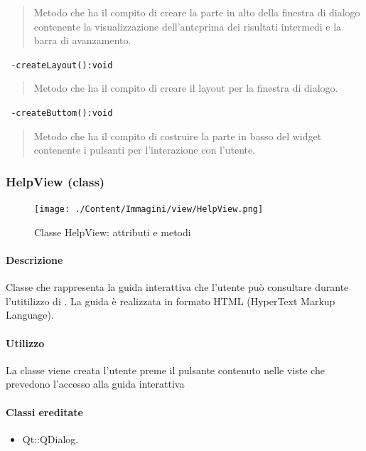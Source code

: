 \begin{quote}
\color{black} Metodo che ha il compito di creare la parte in alto della finestra di dialogo contenente la visualizzazione dell'anteprima dei risultati intermedi e la barra di avanzamento.
\end{quote} 
\color{blue}\verb! -createLayout():void!
\begin{quote}
\color{black} Metodo che ha il compito di creare il layout per la finestra di dialogo.
\end{quote} 
\color{blue}\verb! -createButtom():void!
\color{black}
\begin{quote}
 Metodo che ha il compito di costruire la parte in basso del widget contenente i pulsanti per l'interazione con l'utente.
\end{quote}
\color{black}
\pagebreak
\subsubsection{HelpView (class)}
\label{spehelps}
\begin{figure}[!h]
\centering
			\texttt{[image: ./Content/Immagini/view/HelpView.png]}
			\caption{Classe HelpView: attributi e metodi}
			\label{cl_help}
\end{figure}
\paragraph{Descrizione \\}
Classe che rappresenta la guida interattiva che l'utente può consultare durante l'utitilizzo di \project{}. La guida è realizzata in formato HTML (HyperText Markup Language).
\paragraph{Utilizzo\\}
La classe viene creata l'utente preme il pulsante contenuto nelle viste che prevedono l'accesso alla guida interattiva
\paragraph{Classi ereditate\\}
\begin{itemize}
\item Qt::QDialog.
\end{itemize}
